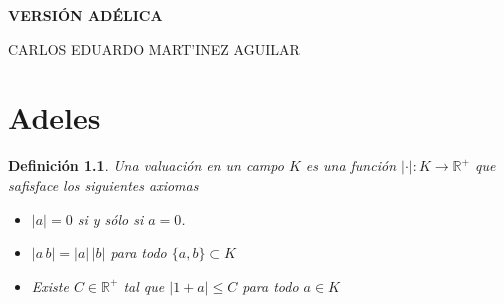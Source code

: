 \documentclass[letterpaper]{report}
\newtheorem{def.}{Definici\'on}[chapter]
\newcommand{\re}{\ensuremath{\mathbb R }}
\begin{document}
\begin{titlepage}
\begin{center}



\LARGE\textbf{VERSIÓN ADÉLICA}
\vspace*{0.5cm}



\small CARLOS EDUARDO MART'INEZ AGUILAR




 
\end{center}
\end{titlepage} 

\chapter{Adeles}
\begin{def.}
Una valuación en un campo $K$ es una función $\vert\cdot\vert:K\rightarrow\re^{+}$ que safisface los siguientes axiomas

\begin{itemize}
\item[i)] $\vert a\vert=0$ si y sólo si $a=0$.
\item[ii)] $\vert a\,b\vert = \vert a\vert\,\vert b\vert$ para todo $\lbrace a,b\rbrace\subset K$
\item[iii)] Existe $C\in\re^{+}$ tal que $\vert 1+a \vert\leq C$ para todo $a\in K$
\end{itemize}
\end{def.}
\end{document}
